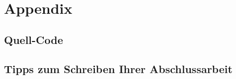 \documentclass[oneside,bibliography=totocnumbered,BCOR=5mm]{scrbook}%
\theoremstyle{definition}
\theoremstyle{definition}
\theoremstyle{definition}
\theoremstyle{definition}
\theoremstyle{definition}
\theoremstyle{definition}
\begin{document}


\clearpage
{}%

\tableofcontents  

 \listoffigures

 \listoftables

 \lstlistoflistings

\newpage

 









\printbibliography[
heading=bibintoc,
title={Quellenverzeichnis}
]

\newpage

\newpage


\appendix
{}
\chapter{Appendix}

\section{Quell-Code}

\section{Tipps zum Schreiben Ihrer Abschlussarbeit}
\end{document}
